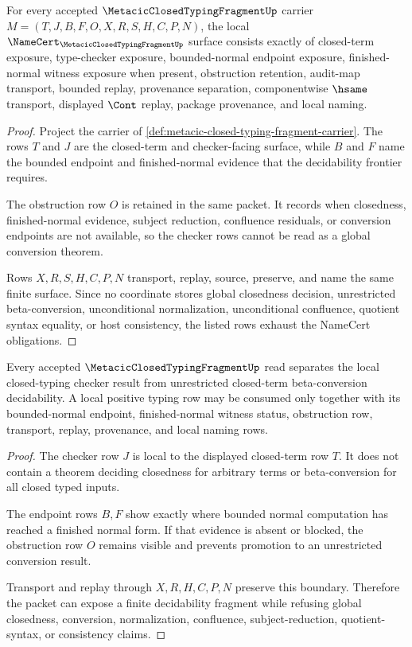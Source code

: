 \begin{theorem}
\label{thm:metacic-closed-typing-fragment-namecert-obligations}
For every accepted $\MetacicClosedTypingFragmentUp$ carrier $M=(T,J,B,F,O,X,R,S,H,C,P,N)$, the local $\NameCert_{\MetacicClosedTypingFragmentUp}$ surface consists exactly of closed-term exposure, type-checker exposure, bounded-normal endpoint exposure, finished-normal witness exposure when present, obstruction retention, audit-map transport, bounded replay, provenance separation, componentwise $\hsame$ transport, displayed $\Cont$ replay, package provenance, and local naming.
\end{theorem}
\begin{proof}
Project the carrier of \autoref{def:metacic-closed-typing-fragment-carrier}. The rows $T$ and $J$ are the closed-term and checker-facing surface, while $B$ and $F$ name the bounded endpoint and finished-normal evidence that the decidability frontier requires.

The obstruction row $O$ is retained in the same packet. It records when closedness, finished-normal evidence, subject reduction, confluence residuals, or conversion endpoints are not available, so the checker rows cannot be read as a global conversion theorem.

Rows $X,R,S,H,C,P,N$ transport, replay, source, preserve, and name the same finite surface. Since no coordinate stores global closedness decision, unrestricted beta-conversion, unconditional normalization, unconditional confluence, quotient syntax equality, or host consistency, the listed rows exhaust the NameCert obligations.
\end{proof}

\begin{theorem}
\label{thm:metacic-closed-typing-fragment-decidable-boundary}
Every accepted $\MetacicClosedTypingFragmentUp$ read separates the local closed-typing checker result from unrestricted closed-term beta-conversion decidability. A local positive typing row may be consumed only together with its bounded-normal endpoint, finished-normal witness status, obstruction row, transport, replay, provenance, and local naming rows.
\end{theorem}
\begin{proof}
The checker row $J$ is local to the displayed closed-term row $T$. It does not contain a theorem deciding closedness for arbitrary terms or beta-conversion for all closed typed inputs.

The endpoint rows $B,F$ show exactly where bounded normal computation has reached a finished normal form. If that evidence is absent or blocked, the obstruction row $O$ remains visible and prevents promotion to an unrestricted conversion result.

Transport and replay through $X,R,H,C,P,N$ preserve this boundary. Therefore the packet can expose a finite decidability fragment while refusing global closedness, conversion, normalization, confluence, subject-reduction, quotient-syntax, or consistency claims.
\end{proof}

